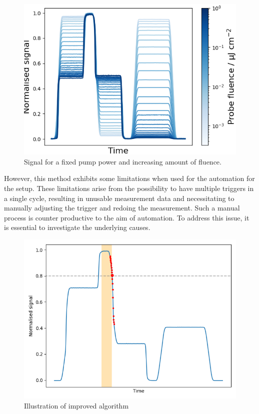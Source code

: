 \begin{figure}
    \vspace{-\baselineskip}
    \centering
    \includegraphics[width=.98\textwidth]{images/trace_complete.png}
    \caption{Signal for a fixed pump power and increasing amount of fluence.}
    \label{fig:complete}
\end{figure}

However, this method exhibits some limitations when used for the automation for the setup. These limitations arise from the possibility to have multiple triggers in a single cycle, resulting in unusable measurement data and necessitating to manually adjusting the trigger and redoing the measurement. Such a manual process is counter productive to the aim of automation. To address this issue, it is essential to investigate the underlying causes.
\begin{figure}
    \vspace{-\baselineskip}
    \centering
    \includegraphics[width=.98\textwidth]{images/corrected_signal.png}
    \caption{Illustration of improved algorithm}
    \label{fig:corrected}
\end{figure}


